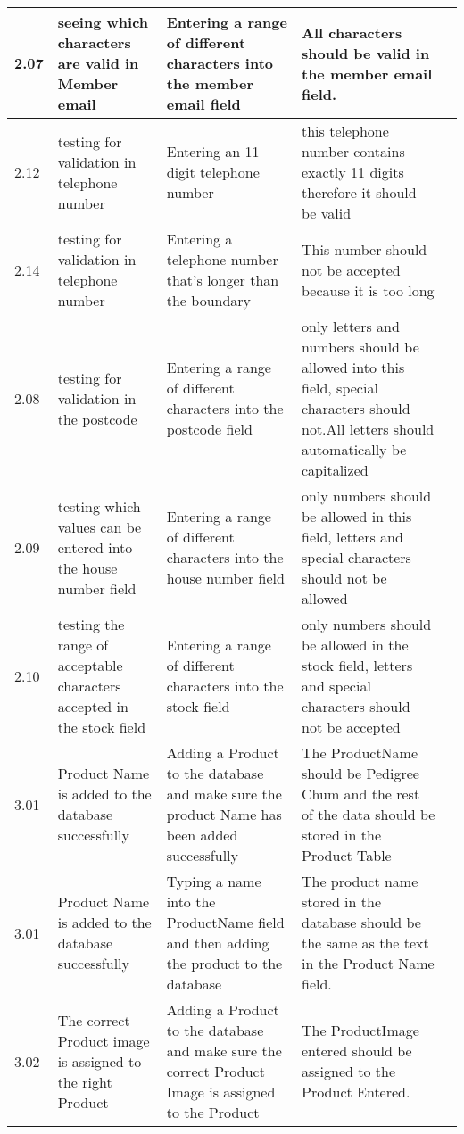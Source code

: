 \begin{flushleft}
\begin{longtable}{|p{1cm}|p{2.5cm}|p{2.5cm}|p{2cm}|p{2cm}|}
	\rowcolor{light-grey}2.07 & seeing which characters are valid in Member email & Entering a range of different characters into the member email field &  All characters should be valid in the member email field.& \\ \hline
	\rowcolor{dark-grey}2.12 & testing for validation in telephone number & Entering an 11 digit telephone number  & this telephone number contains exactly 11 digits therefore it should be valid & \\ \hline
	\rowcolor{dark-grey}2.14 & testing for validation in telephone number & Entering a telephone number that's longer than the boundary & This number should not be accepted because it is too long & \\ \hline
	\rowcolor{light-grey}2.08 & testing for validation in the postcode & Entering a range of different characters into the postcode field & only letters and numbers should be allowed into this field, special characters should not.All letters should automatically be capitalized& \\ \hline
	\rowcolor{light-grey}2.09 & testing which values can be entered into the house number field & Entering a range of different characters into the house number field & only numbers should be allowed in this field, letters and special characters should not be allowed & \\ \hline
	\rowcolor{light-grey}2.10 & testing the range of acceptable characters accepted in the stock field  & Entering a range of different characters into the stock field & only numbers should be allowed in the stock field, letters and special characters should not be accepted & \\ \hline
	\rowcolor{dark-grey}3.01 & Product Name is added to the database successfully & Adding a Product to the database and make sure the product Name has been added successfully & The ProductName should be Pedigree Chum and the rest of the data should be stored in the Product Table & \\ \hline
	\rowcolor{light-grey}3.01 & Product Name is added to the database successfully & Typing a name into the ProductName field and then adding the product to the database & The product name stored in the database should be the same as the text in the Product Name field.& \\ \hline
	3.02 & The correct Product image is assigned to the right Product & Adding a Product to the database and make sure the correct Product Image is assigned to the Product & The ProductImage entered should be assigned to the Product Entered. & \\ \hline

\end{longtable}
\end{flushleft}
